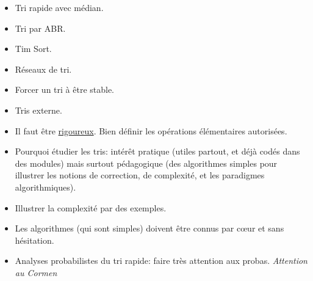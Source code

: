 \documentclass{agregfiche}
\begin{document}
\secidees

\begin{itemize}
    \item Tri rapide avec médian.
    \item Tri par ABR.
    \item Tim Sort.
    \item Réseaux de tri.
    \item Forcer un tri à être stable.
    \item Tris externe.
\end{itemize}

\secpieges

\begin{itemize}
    \item Il faut être \underline{rigoureux}. Bien définir les opérations élémentaires autorisées.
    \item Pourquoi étudier les tris: intérêt pratique (utiles partout, et déjà codés dans des modules) mais surtout pédagogique (des algorithmes simples pour illustrer les notions de correction, de complexité, et les paradigmes algorithmiques).
    \item Illustrer la complexité par des exemples.
    \item Les algorithmes (qui sont simples) doivent être connus par c\oe ur et sans hésitation.
    \item Analyses probabilistes du tri rapide: faire très attention aux probas.
        \emph{Attention au Cormen}
\end{itemize}


\secquestionsclassiques
\end{document}

